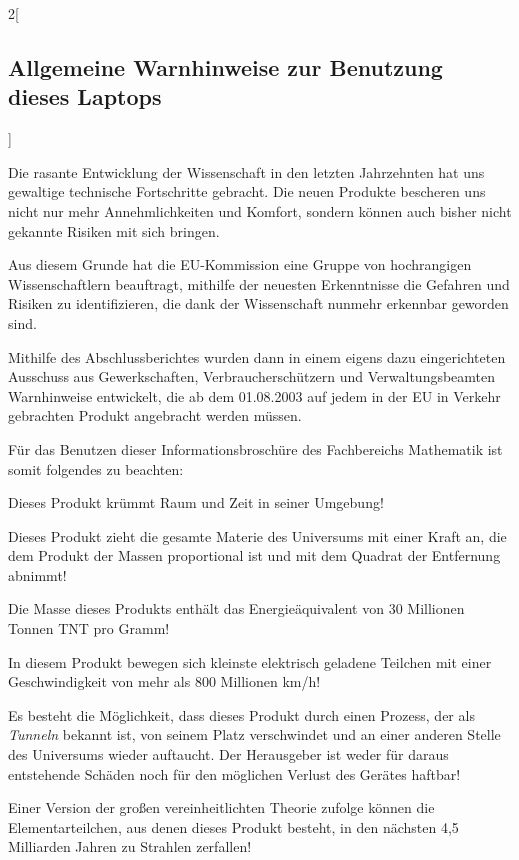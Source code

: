 \begin{multicols}{2}[\subsection{Allgemeine Warnhinweise zur Benutzung dieses
Laptops}]

Die rasante Entwicklung der Wissenschaft in den letzten Jahrzehnten hat uns
gewaltige technische Fortschritte gebracht. Die neuen Produkte bescheren uns
nicht nur mehr Annehmlichkeiten und Komfort, sondern können auch bisher nicht
gekannte Risiken mit sich bringen.

Aus diesem Grunde hat die EU-Kommission eine Gruppe von hochrangigen
Wissenschaftlern beauftragt, mithilfe der neuesten Erkenntnisse die Gefahren
und Risiken zu identifizieren, die dank der Wissenschaft nunmehr erkennbar
geworden sind.

Mithilfe des Abschlussberichtes wurden dann in einem eigens dazu eingerichteten
Ausschuss aus Gewerkschaften, Verbraucherschützern und Verwaltungsbeamten
Warnhinweise entwickelt, die ab dem 01.08.2003 auf jedem in der EU in Verkehr
gebrachten Produkt angebracht werden müssen.

Für das Benutzen dieser Informationsbroschüre des Fachbereichs Mathematik ist
somit folgendes zu beachten:

\important Dieses Produkt krümmt Raum und Zeit in seiner Umgebung!

\important Dieses Produkt zieht die gesamte Materie des Universums mit einer
Kraft an, die dem Produkt der Massen proportional ist und mit dem Quadrat der
Entfernung abnimmt!

\important Die Masse dieses Produkts enthält das Energieäquivalent von 30
Millionen Tonnen TNT pro Gramm!

\important In diesem Produkt bewegen sich kleinste elektrisch geladene Teilchen
mit einer Geschwindigkeit von mehr als 800 Millionen km/h!

\important Es besteht die Möglichkeit, dass dieses Produkt durch einen Prozess,
der als \emph{Tunneln} bekannt ist, von seinem Platz verschwindet und an einer
anderen Stelle des Universums wieder auftaucht. Der Herausgeber ist weder für
daraus entstehende Schäden noch für den möglichen Verlust des Gerätes haftbar!

\important Einer Version der großen vereinheitlichten Theorie zufolge können
die Elementarteilchen, aus denen dieses Produkt besteht, in den nächsten 4,5
Milliarden Jahren zu Strahlen zerfallen!


\end{multicols}
